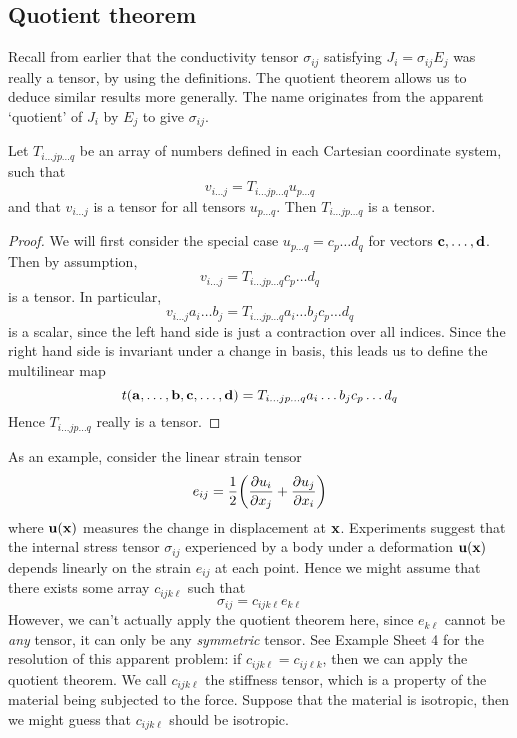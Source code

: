 \subsection{Quotient theorem}
Recall from earlier that the conductivity tensor \(\sigma_{ij}\) satisfying \(J_i = \sigma_{ij} E_j\) was really a tensor, by using the definitions.
The quotient theorem allows us to deduce similar results more generally.
The name originates from the apparent `quotient' of \(J_i\) by \(E_j\) to give \(\sigma_{ij}\).
\begin{proposition}
	Let \(T_{i\dots j p\dots q}\) be an array of numbers defined in each Cartesian coordinate system, such that
	\[
		v_{i\dots j} = T_{i\dots j p \dots q} u_{p\dots q}
	\]
	and that \(v_{i\dots j}\) is a tensor for all tensors \(u_{p\dots q}\).
	Then \(T_{i\dots j p\dots q}\) is a tensor.
\end{proposition}
\begin{proof}
	We will first consider the special case \(u_{p\dots q} = c_p \dots d_q\) for vectors \(\vb c, \dots, \vb d\).
	Then by assumption,
	\[
		v_{i\dots j} = T_{i\dots j p \dots q} c_p \dots d_q
	\]
	is a tensor.
	In particular,
	\[
		v_{i\dots j} a_i \dots b_j = T_{i\dots j p \dots q} a_i \dots b_j c_p \dots d_q
	\]
	is a scalar, since the left hand side is just a contraction over all indices.
	Since the right hand side is invariant under a change in basis, this leads us to define the multilinear map
	\[
		t(\vb a, \dots, \vb b, \vb c, \dots, \vb d) = T_{i\dots j p \dots q} a_i \dots b_j c_p \dots d_q
	\]
	Hence \(T_{i\dots j p \dots q}\) really is a tensor.
\end{proof}
\noindent As an example, consider the linear strain tensor
\[
	e_{ij} = \frac{1}{2}\qty( \pdv{u_i}{x_j} + \pdv{u_j}{x_i} )
\]
where \(\vb u(\vb x)\) measures the change in displacement at \(\vb x\).
Experiments suggest that the internal stress tensor \(\sigma_{ij}\) experienced by a body under a deformation \(\vb u(\vb x)\) depends linearly on the strain \(e_{ij}\) at each point.
Hence we might assume that there exists some array \(c_{ijk\ell}\) such that
\[
	\sigma_{ij} = c_{ijk\ell} e_{k\ell}
\]
However, we can't actually apply the quotient theorem here, since \(e_{k\ell}\) cannot be \textit{any} tensor, it can only be any \textit{symmetric} tensor.
See Example Sheet 4 for the resolution of this apparent problem: if \(c_{ijk\ell} = c_{ij\ell k}\), then we can apply the quotient theorem.
We call \(c_{ijk\ell}\) the stiffness tensor, which is a property of the material being subjected to the force.
Suppose that the material is isotropic, then we might guess that \(c_{ijk\ell}\) should be isotropic.
